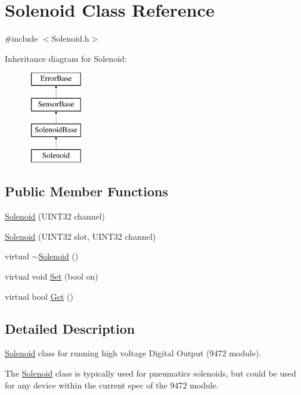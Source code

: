 \hypertarget{classSolenoid}{\section{\-Solenoid \-Class \-Reference}
\label{classSolenoid}
}


{\ttfamily \#include $<$\-Solenoid.\-h$>$}

\-Inheritance diagram for \-Solenoid\-:\begin{figure}[H]
\begin{center}
\leavevmode
\includegraphics[height=4.000000cm]{classSolenoid}
\end{center}
\end{figure}
\subsection*{\-Public \-Member \-Functions}
\begin{DoxyCompactItemize}
\item 
\hyperlink{classSolenoid_a84efe24ac994ba56781e3c6f1b1b8c56}{\-Solenoid} (\-U\-I\-N\-T32 channel)
\item 
\hyperlink{classSolenoid_aa155888eec5f296d849847d804612f59}{\-Solenoid} (\-U\-I\-N\-T32 slot, \-U\-I\-N\-T32 channel)
\item 
virtual \hyperlink{classSolenoid_a34907a41f61848e199967e0319154d13}{$\sim$\-Solenoid} ()
\item 
virtual void \hyperlink{classSolenoid_a913e4530ea804c7c0e3baf2458b4dee3}{\-Set} (bool on)
\item 
virtual bool \hyperlink{classSolenoid_ab9eda95dc5f78d2f808a053d33e40814}{\-Get} ()
\end{DoxyCompactItemize}


\subsection{\-Detailed \-Description}
\hyperlink{classSolenoid}{\-Solenoid} class for running high voltage \-Digital \-Output (9472 module).

\-The \hyperlink{classSolenoid}{\-Solenoid} class is typically used for pneumatics solenoids, but could be used for any device within the current spec of the 9472 module. 

